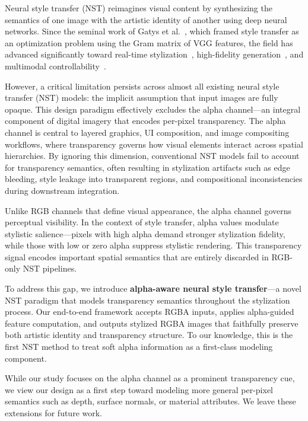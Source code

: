 \documentclass[letterpaper]{article} %
\begin{document}
Neural style transfer (NST) reimagines visual content by synthesizing the semantics of one image with the artistic identity of another using deep neural networks. 
Since the seminal work of Gatys et al.~\cite{gatys2016image}, which framed style transfer as an optimization problem using the Gram matrix of VGG features, the field has advanced significantly toward real-time stylization~\cite{huang2017arbitrary}, high-fidelity generation~\cite{kwon2024aesfa}, and multimodal controllability~\cite{ahn2024dreamstyler}.

However, a critical limitation persists across almost all existing neural style transfer (NST) models: the implicit assumption that input images are fully opaque. This design paradigm effectively excludes the alpha channel—an integral component of digital imagery that encodes per-pixel transparency. The alpha channel is central to layered graphics, UI composition, and image compositing workflows, where transparency governs how visual elements interact across spatial hierarchies. By ignoring this dimension, conventional NST models fail to account for transparency semantics, often resulting in stylization artifacts such as edge bleeding, style leakage into transparent regions, and compositional inconsistencies during downstream integration.

Unlike RGB channels that define visual appearance, the alpha channel governs perceptual visibility. In the context of style transfer, alpha values modulate stylistic salience—pixels with high alpha demand stronger stylization fidelity, while those with low or zero alpha suppress stylistic rendering. This transparency signal encodes important spatial semantics that are entirely discarded in RGB-only NST pipelines.

To address this gap, we introduce \textbf{alpha-aware neural style transfer}—a novel NST paradigm that models transparency semantics throughout the stylization process. Our end-to-end framework accepts RGBA inputs, applies alpha-guided feature computation, and outputs stylized RGBA images that faithfully preserve both artistic identity and transparency structure. To our knowledge, this is the first NST method to treat soft alpha information as a first-class modeling component.

While our study focuses on the alpha channel as a prominent transparency cue, we view our design as a first step toward modeling more general per-pixel semantics such as depth, surface normals, or material attributes. We leave these extensions for future work.
\end{document}
